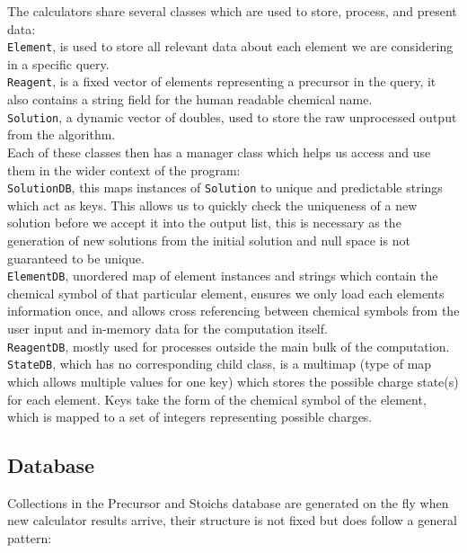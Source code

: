 The calculators share several classes which are used to store, process, and present data: \\

\texttt{Element}, is used to store all relevant data about each element we are considering in a specific query. \\

\texttt{Reagent}, is a fixed vector of elements representing a precursor in the query, it also contains a string field for the human readable chemical name. \\

\texttt{Solution}, a dynamic vector of doubles, used to store the raw unprocessed output from the algorithm.\\

Each of these classes then has a manager class which helps us access and use them in the wider context of the program: \\

\texttt{SolutionDB}, this maps instances of \texttt{Solution} to unique and predictable strings which act as keys. This allows us to quickly check the uniqueness of a new solution before we accept it into the output list, this is necessary as the generation of new solutions from the initial solution and null space is not guaranteed to be unique. \\

\texttt{ElementDB}, unordered map of element instances and strings which contain the chemical symbol of that particular element, ensures we only load each elements information once, and allows cross referencing between chemical symbols from the user input and in-memory data for the computation itself. \\

\texttt{ReagentDB}, mostly used for processes outside the main bulk of the computation. \\

\texttt{StateDB}, which has no corresponding child class, is a multimap (type of map which allows multiple values for one key) which stores the possible charge state(s) for each element. Keys take the form of the chemical symbol of the element, which is mapped to a set of integers representing possible charges.

\subsection{Database} 
Collections in the Precursor and Stoichs database are generated on the fly when new calculator results arrive, their structure is not fixed but does follow a general pattern:

